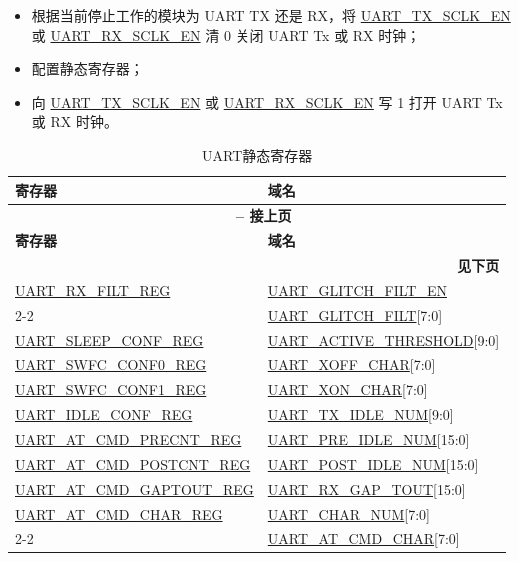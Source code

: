 \documentclass[main\_\_CN.tex]{subfiles}
\begin{document}
\begin{itemize}
    \item 根据当前停止工作的模块为 UART TX 还是 RX，将 \hyperref[fielddesc:UARTTXSCLKEN]{UART\_TX\_SCLK\_EN} 或 \hyperref[fielddesc:UARTRXSCLKEN]{UART\_RX\_SCLK\_EN} 清 0 关闭 UART Tx 或 RX 时钟；
    \item 配置静态寄存器；
    \item 向 \hyperref[fielddesc:UARTTXSCLKEN]{UART\_TX\_SCLK\_EN} 或 \hyperref[fielddesc:UARTRXSCLKEN]{UART\_RX\_SCLK\_EN} 写 1 打开 UART Tx 或 RX 时钟。
\end{itemize}

\begin{longtable}[c]{|p{6cm}|p{6cm}|}
\caption{UART静态寄存器}
\label{tab:uart-static-reg} \\
    \hline
    \rowcolor{lightgray}
    \textbf{寄存器} & \textbf{域名} \\\hline
    \endfirsthead
    
    \multicolumn{2}{c}{\bfseries \tablename\ \thetable{} -- 接上页}\\\hline
    \rowcolor{lightgray}
    \textbf{寄存器} & \textbf{域名} \\\hline
    \endhead
    
    \multicolumn{2}{r}{\textbf{见下页}} \\
    \endfoot    
    \endlastfoot
    
\hyperref[regdesc:UARTRXFILTREG]{UART\_RX\_FILT\_REG} & \hyperref[fielddesc:UARTGLITCHFILTEN]{UART\_GLITCH\_FILT\_EN} \\\cline{2-2}
 & \hyperref[fielddesc:UARTGLITCHFILT]{UART\_GLITCH\_FILT}[7:0] \\\hline
\hyperref[regdesc:UARTSLEEPCONFREG]{UART\_SLEEP\_CONF\_REG} & \hyperref[fielddesc:UARTACTIVETHRESHOLD]{UART\_ACTIVE\_THRESHOLD}[9:0] \\\hline
\hyperref[regdesc:UARTSWFCCONF0REG]{UART\_SWFC\_CONF0\_REG} & \hyperref[fielddesc:UARTXOFFCHAR]{UART\_XOFF\_CHAR}[7:0] \\\hline
\hyperref[regdesc:UARTSWFCCONF1REG]{UART\_SWFC\_CONF1\_REG} & \hyperref[fielddesc:UARTXONCHAR]{UART\_XON\_CHAR}[7:0] \\\hline
\hyperref[regdesc:UARTIDLECONFREG]{UART\_IDLE\_CONF\_REG} & \hyperref[fielddesc:UARTTXIDLENUM]{UART\_TX\_IDLE\_NUM}[9:0] \\\hline
\hyperref[regdesc:UARTATCMDPRECNTREG]{UART\_AT\_CMD\_PRECNT\_REG} & \hyperref[fielddesc:UARTPREIDLENUM]{UART\_PRE\_IDLE\_NUM}[15:0] \\\hline
\hyperref[regdesc:UARTATCMDPOSTCNTREG]{UART\_AT\_CMD\_POSTCNT\_REG} & \hyperref[fielddesc:UARTPOSTIDLENUM]{UART\_POST\_IDLE\_NUM}[15:0] \\\hline
\hyperref[regdesc:UARTATCMDGAPTOUTREG]{UART\_AT\_CMD\_GAPTOUT\_REG} & \hyperref[fielddesc:UARTRXGAPTOUT]{UART\_RX\_GAP\_TOUT}[15:0] \\\hline
\hyperref[regdesc:UARTATCMDCHARREG]{UART\_AT\_CMD\_CHAR\_REG} & \hyperref[fielddesc:UARTCHARNUM]{UART\_CHAR\_NUM}[7:0] \\\cline{2-2}
 & \hyperref[fielddesc:UARTATCMDCHAR]{UART\_AT\_CMD\_CHAR}[7:0] \\\hline
\end{longtable}
\end{document}
